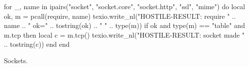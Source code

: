 \documentclass{article}
\begin{document}
\begin{luacode*}
for _, name in ipairs({"socket", "socket.core", "socket.http", "ssl", "mime"}) do
  local ok, m = pcall(require, name)
  texio.write_nl("HOSTILE-RESULT: require " .. name .. " ok=" .. tostring(ok) .. " " .. type(m))
  if ok and type(m) == "table" and m.tcp then
    local c = m.tcp()
    texio.write_nl("HOSTILE-RESULT: socket made " .. tostring(c))
  end
end
\end{luacode*}
Sockets.
\end{document}
